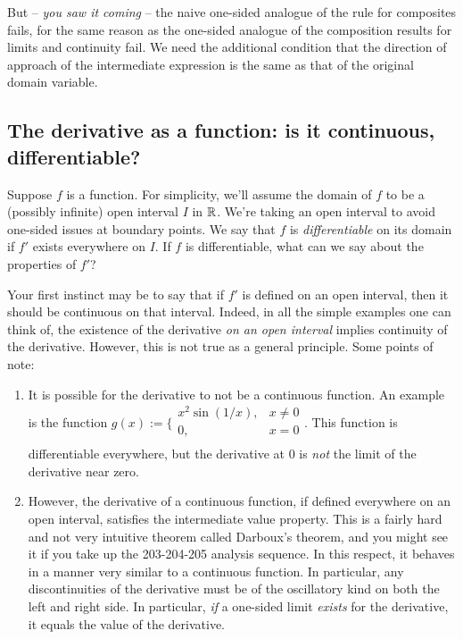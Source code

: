 \documentclass[10pt]{amsart}
\begin{document}
But -- {\em you saw it coming} -- the naive one-sided analogue of the
rule for composites fails, for the same reason as the one-sided
analogue of the composition results for limits and continuity fail. We
need the additional condition that the direction of approach of the
intermediate expression is the same as that of the original domain
variable.

\subsection{The derivative as a function: is it continuous, differentiable?}

Suppose $f$ is a function. For simplicity, we'll assume the domain of
$f$ to be a (possibly infinite) open interval $I$ in $\mathbb{R}$. We're
taking an open interval to avoid one-sided issues at boundary
points. We say that $f$ is {\em differentiable} on its domain if $f'$
exists everywhere on $I$. If $f$ is differentiable, what can we say
about the properties of $f'$?

Your first instinct may be to say that if $f'$ is defined on an open
interval, then it should be continuous on that interval. Indeed, in
all the simple examples one can think of, the existence of the
derivative {\em on an open interval} implies continuity of the
derivative. However, this is not true as a general principle. Some
points of note:

\begin{enumerate}
\item It is possible for the derivative to not be a continuous
  function. An example is the function $g(x) :=
  \lbrace\begin{array}{rl} x^2\sin(1/x), & x \ne 0\\0,& x = 0
  \\\end{array}$. This function is differentiable everywhere, but the
  derivative at $0$ is {\em not} the limit of the derivative near
  zero.
\item However, the derivative of a continuous function, if defined
  everywhere on an open interval, satisfies the intermediate value
  property. This is a fairly hard and not very intuitive theorem
  called Darboux's theorem, and you might see it if you take up the
  203-204-205 analysis sequence. In this respect, it behaves in a manner
  very similar to a continuous function. In particular, any
  discontinuities of the derivative must be of the oscillatory kind on
  both the left and right side. In particular, {\em if} a one-sided
  limit {\em exists} for the derivative, it equals the value of the
  derivative.
\end{enumerate}
\end{document}
